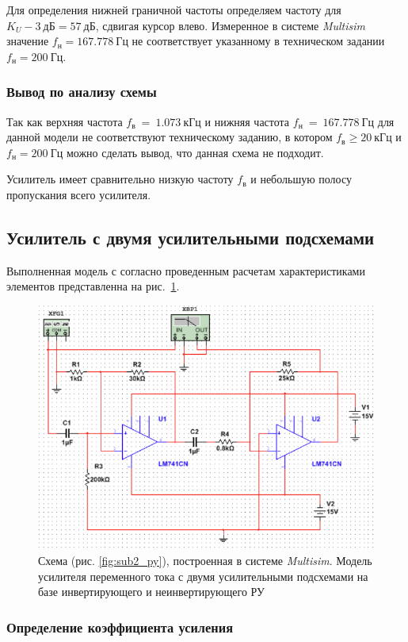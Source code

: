 Для определения нижней граничной частоты 
определяем частоту для $ K_U - 3~дБ = 57~дБ $, 
сдвигая курсор влево. 
Измеренное в системе \textit{Multisim} значение 
$ f_н = 167.778~Гц $ не соответствует 
указанному в техническом задании $ f_н = 200~Гц $.

\subsubsection*{Вывод по анализу схемы}

Так как 
верхняя частота $ f_в~=~1.073~кГц $ и 
нижняя частота $ f_н~=~167.778~Гц $
для данной модели не соответствуют 
техническому заданию, в котором 
$ f_в \ge 20~кГц $ и
$ f_н = 200~Гц $
можно сделать вывод, что данная схема не подходит.

Усилитель имеет сравнительно низкую частоту $ f_в $ 
и небольшую полосу пропускания всего усилителя.

\subsection{Усилитель с двумя усилительными подсхемами}

Выполненная модель с согласно проведенным 
расчетам характеристиками элементов
представленна на рис.~\ref{fig:sub2_modeled}.

\begin{figure}[H]
	\centering
	\includegraphics[width=0.7\linewidth]{photo/sub2_modeled}
	\caption{
		Схема (рис. \ref{fig:sub2_py}), 
		построенная в системе \textit{Multisim}. 
		Модель
		усилителя переменного тока
		с двумя усилительными подсхемами
		на базе инвертирующего и неинвертирующего РУ
	}
	\label{fig:sub2_modeled}
\end{figure}

\subsubsection*{Определение коэффициента усиления}

